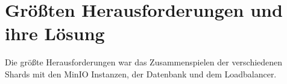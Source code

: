 \documentclass[12pt]{report}
\begin{document}
	\section{Größten Herausforderungen und ihre Lösung}
	Die größte Herausforderungen war das Zusammenspielen der verschiedenen Shards mit den MinIO Instanzen, der Datenbank und dem Loadbalancer.

\newpage
{}
\setcounter{page}{\value{frontmatterPage}} %
\addtocounter{page}{1}

\renewcommand{\refname}{Literaturverzeichnis}


\end{document}
